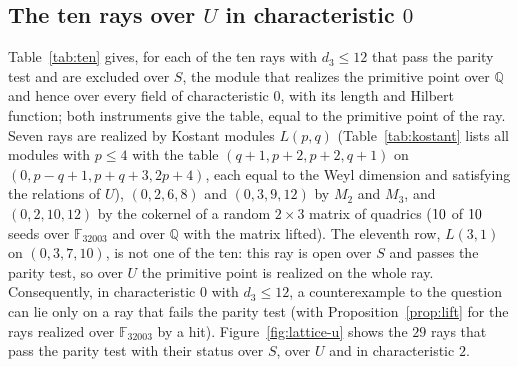 \documentclass[11pt]{article}
\theoremstyle{definition}
\theoremstyle{remark}
\newcommand{\Q}{\mathbb{Q}}
\newcommand{\F}{\mathbb{F}}
\begin{document}
\subsection{The ten rays over \texorpdfstring{$U$}{U} in characteristic \texorpdfstring{$0$}{0}}

Table~\ref{tab:ten} gives, for each of the ten rays with $d_3\le12$ that pass the parity test and are excluded over $S$, the module that realizes the primitive point over $\Q$ and hence over every field of characteristic $0$, with its length and Hilbert function; both instruments give the table, equal to the primitive point of the ray. Seven rays are realized by Kostant modules $L(p,q)$ (Table~\ref{tab:kostant} lists all \nkostantCount{} modules with $p\le4$ with the table $(q+1,p+2,p+2,q+1)$ on $(0,p-q+1,p+q+3,2p+4)$, each equal to the Weyl dimension and satisfying the relations of $U$), $(0,2,6,8)$ and $(0,3,9,12)$ by $M_2$ and $M_3$, and $(0,2,10,12)$ by the cokernel of a random $2\times3$ matrix of quadrics ($10{}$ of $10{}$ seeds over $\F_{32003}$ and over $\Q$ with the matrix lifted). The eleventh row, $L(3,1)$ on $(0,3,7,10)$, is not one of the ten: this ray is open over $S$ and passes the parity test, so over $U$ the primitive point is realized on the whole ray. Consequently, in characteristic $0$ with $d_3\le12$, a counterexample to the question can lie only on a ray that fails the parity test (with Proposition~\ref{prop:lift} for the rays realized over $\F_{32003}$ by a hit). Figure~\ref{fig:lattice-u} shows the $29$ rays that pass the parity test with their status over $S$, over $U$ and in characteristic $2$.

\begin{table}[htbp]
\centering\footnotesize

\caption{The ten rays with $d_3\le12$ that pass the parity test and are excluded over $S$, each with the module that realizes the primitive point over $U$ in characteristic $0$, its length and Hilbert function; the last row is a ray that is open over $S$ and realized over $U$ by a Kostant module; both instruments give a table equal to the primitive point.}
\label{tab:ten}
\end{table}

\begin{table}[htbp]
\centering\footnotesize

\caption{The \nkostantCount{} Kostant modules $L(p,q)$ with $p\le4$ built from the representations of $\mathfrak{sp}_4$ and recomputed by both instruments: length, Hilbert function, Betti numbers and the degrees $(d_0,d_1,d_2,d_3)=(0,p-q+1,p+q+3,2p+4)$; every table equals $(q+1,p+2,p+2,q+1)$.}
\label{tab:kostant}
\end{table}
\end{document}
